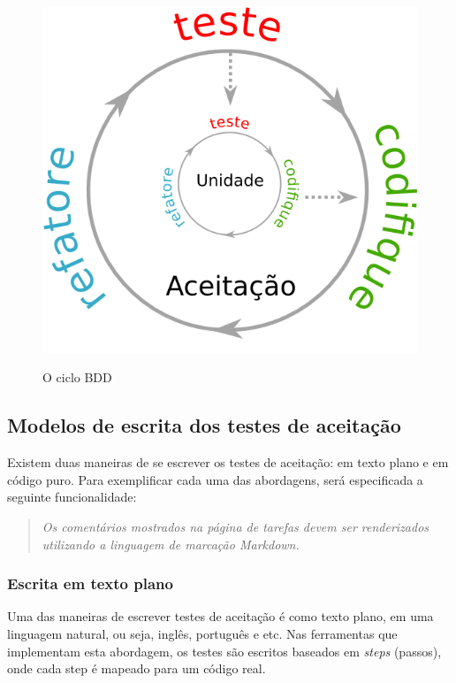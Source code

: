 \begin{figure}[h]
  \center
  \caption{O ciclo BDD}
  \includegraphics[scale=0.45]{images/ciclo-bdd}
  \label{img:ciclo-bdd}
\end{figure}


\subsection{Modelos de escrita dos testes de aceitação}
\label{sub:modelos_de_escrita_dos_testes_de_aceitacao}

Existem duas maneiras de se escrever os testes de aceitação: em texto plano e em código puro. Para exemplificar cada uma das abordagens, será especificada a seguinte funcionalidade:

\begin{quote}
\textit{Os comentários mostrados na página de tarefas devem ser renderizados utilizando a linguagem de marcação Markdown.}
\end{quote}

\subsubsection{Escrita em texto plano} %
\label{subsub:escrita_em_texto_plano}

Uma das maneiras de escrever testes de aceitação é como texto plano, em uma linguagem natural, ou seja, inglês, português e etc. Nas ferramentas que implementam esta abordagem, os testes são escritos baseados em \textit{steps} (passos), onde cada step é mapeado para um código real.

